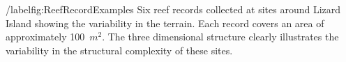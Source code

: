 /label{fig:ReefRecordExamples} Six reef records collected at sites around Lizard Island showing the variability in the terrain.  Each record covers an area of approximately 100~$m^2$.  The three dimensional structure clearly illustrates the variability in the structural complexity of these sites.